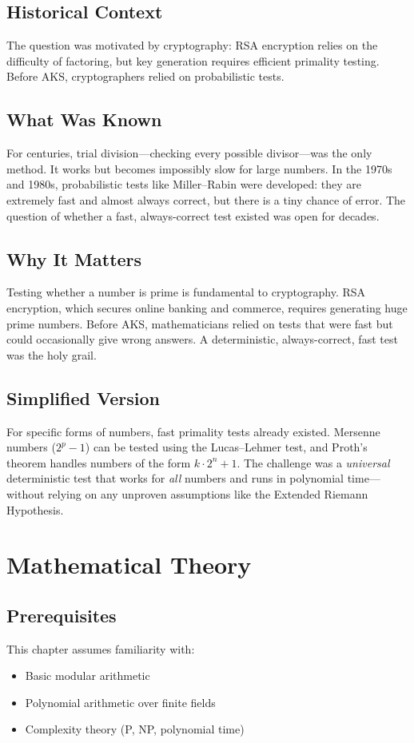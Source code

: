 \subsection{Historical Context}
The question was motivated by cryptography: RSA encryption relies on the difficulty of factoring, but key generation requires efficient primality testing. Before AKS, cryptographers relied on probabilistic tests.

\subsection{What Was Known}
For centuries, trial division---checking every possible divisor---was the only method. It works but becomes impossibly slow for large numbers. In the 1970s and 1980s, probabilistic tests like Miller--Rabin were developed: they are extremely fast and almost always correct, but there is a tiny chance of error. The question of whether a fast, always-correct test existed was open for decades.

\subsection{Why It Matters}
Testing whether a number is prime is fundamental to cryptography. RSA encryption, which secures online banking and commerce, requires generating huge prime numbers. Before AKS, mathematicians relied on tests that were fast but could occasionally give wrong answers. A deterministic, always-correct, fast test was the holy grail.

\subsection{Simplified Version}
For specific forms of numbers, fast primality tests already existed. Mersenne numbers ($2^p - 1$) can be tested using the Lucas--Lehmer test, and Proth's theorem handles numbers of the form $k \cdot 2^n + 1$. The challenge was a \emph{universal} deterministic test that works for \emph{all} numbers and runs in polynomial time---without relying on any unproven assumptions like the Extended Riemann Hypothesis.

\section{Mathematical Theory}

\subsection{Prerequisites}
This chapter assumes familiarity with:
\begin{itemize}
\item Basic modular arithmetic
\item Polynomial arithmetic over finite fields
\item Complexity theory (P, NP, polynomial time)
\end{itemize}

